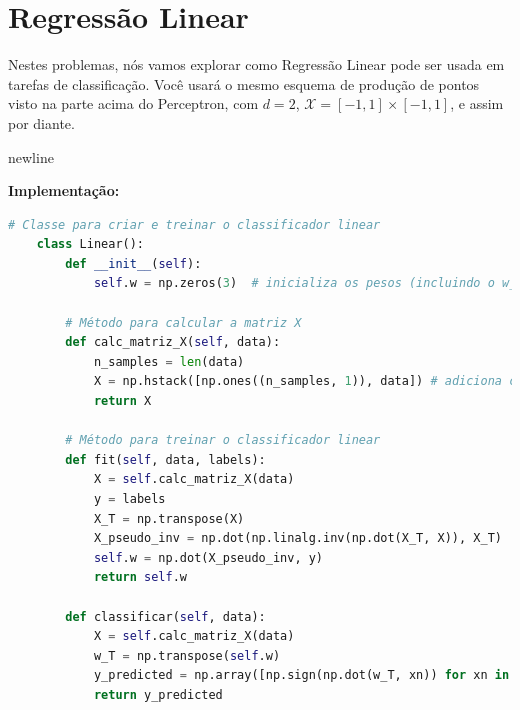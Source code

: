 \section{Regressão Linear}

Nestes problemas, nós vamos explorar como Regressão Linear pode ser usada em tarefas de classificação.
Você usará o mesmo esquema de produção de pontos visto na parte acima do Perceptron, com $d = 2$,
$\mathcal{X} = [-1, 1] \times [-1, 1]$, e assim por diante.

newline \par
\textbf{Implementação:}



\begin{lstlisting}[language=Python, caption=Classificador por Regressão Linear, label=cod:reglin]
    # Classe para criar e treinar o classificador linear
    class Linear():
        def __init__(self):
            self.w = np.zeros(3)  # inicializa os pesos (incluindo o w_0)
        
        # Método para calcular a matriz X
        def calc_matriz_X(self, data):
            n_samples = len(data)
            X = np.hstack([np.ones((n_samples, 1)), data]) # adiciona coluna de 1s
            return X
        
        # Método para treinar o classificador linear
        def fit(self, data, labels):
            X = self.calc_matriz_X(data)
            y = labels
            X_T = np.transpose(X)
            X_pseudo_inv = np.dot(np.linalg.inv(np.dot(X_T, X)), X_T)
            self.w = np.dot(X_pseudo_inv, y)
            return self.w
        
        def classificar(self, data):
            X = self.calc_matriz_X(data)
            w_T = np.transpose(self.w)
            y_predicted = np.array([np.sign(np.dot(w_T, xn)) for xn in X])
            return y_predicted
\end{lstlisting}


